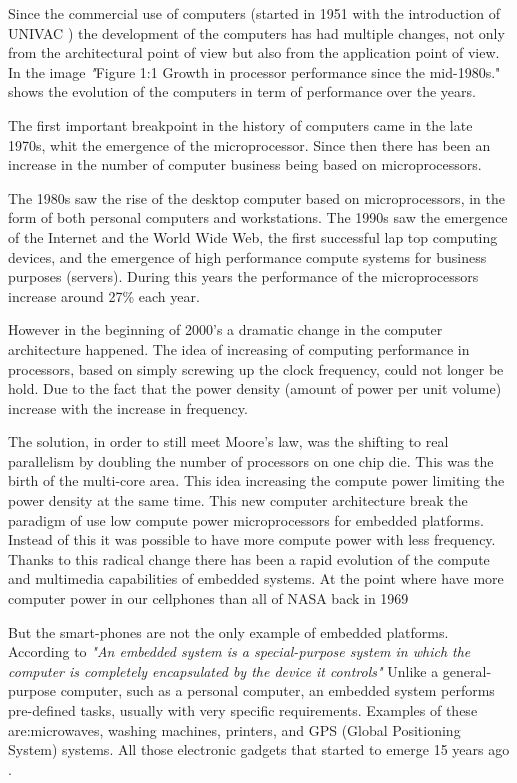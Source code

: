 Since the commercial use of computers (started in 1951 with the
introduction of UNIVAC \cite{Nur}) the development of the computers has had
multiple changes, not only from the architectural point of view but also from
the application point of view. In \cite{Hennessy} the image \textit"{Figure 1:1
Growth in processor performance since the mid-1980s."} shows the evolution of
the computers in term of performance over the years. 

The first important breakpoint in the history of computers came in the late
1970s, whit the emergence of the microprocessor. Since then there has been an
increase in the number of computer business being based on microprocessors. 

The 1980s saw the rise of the desktop computer based on microprocessors, in the
form of both personal computers and workstations. The 1990s saw the emergence
of the Internet and the World Wide Web, the first successful lap top computing
devices, and the emergence of high performance compute systems for business
purposes (servers). During this years the performance of the microprocessors
increase around 27\% each year.\cite{Hennessy}

However in the beginning of 2000's a dramatic change in the computer
architecture happened. The idea of increasing of computing performance in
processors, based on simply screwing up the clock frequency, could not longer
be hold. Due to the fact that the power density (amount of power per unit
volume) increase with the increase in frequency.

The solution, in order to still meet Moore's law, was the shifting to real
parallelism by doubling the number of processors on one chip die. This was the
birth of the multi-core area. This idea increasing the compute power limiting
the power density at the same time. This new computer architecture break the
paradigm of use low compute power microprocessors for embedded platforms.
Instead of this it was possible to have more compute power with less frequency.
Thanks to this radical change there has been a rapid evolution of the compute
and multimedia capabilities of embedded systems. At the point where have more
computer power in our cellphones than all of NASA back in 1969 \cite{Michio}



But the smart-phones are not the only example of embedded platforms.
According to \cite{Hallinan} \textit{"An embedded system is a special-purpose
system in which the computer is completely encapsulated by the device it
controls"} Unlike a general-purpose computer, such as a personal
computer, an embedded system performs pre-defined tasks, usually with very
specific requirements. Examples of these are:microwaves, washing machines, printers,
and GPS (Global Positioning System) systems. All those electronic
gadgets that started to emerge 15 years ago \cite{Nur}.

